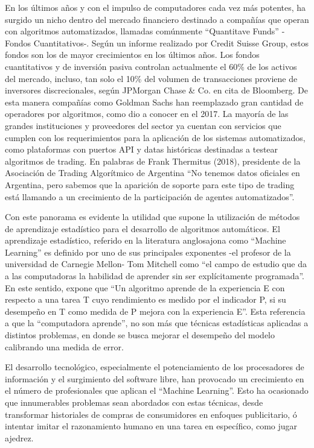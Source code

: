 \documentclass[a4paper,12pt]{Latex/Classes/PhDthesisPSnPDF}
\begin{document}
En los últimos años y con el impulso de computadores cada vez más potentes, ha surgido un nicho dentro del mercado financiero destinado a compañías que operan con algoritmos automatizados, llamadas comúnmente “Quantitave Funds” -Fondos Cuantitativos-. Según un informe realizado por Credit Suisse Group, estos fondos son los de mayor crecimientos en los últimos años. Los fondos cuantitativos y de inversión pasiva controlan actualmente el 60\% de los activos del mercado, incluso, tan solo el 10\% del volumen de transacciones proviene de inversores discrecionales, según JPMorgan Chase \& Co. en cita de Bloomberg. De esta manera compañías como Goldman Sachs han reemplazado gran cantidad de operadores por algoritmos, como dio a conocer en el 2017. La mayoría de las grandes instituciones y proveedores del sector ya cuentan con servicios que cumplen con los requerimientos para la aplicación de los sistemas automatizados, como plataformas con puertos API y datas históricas destinadas a testear algoritmos de trading. En palabras de Frank Thermitus (2018), presidente de la Asociación de Trading Algorítmico de Argentina “No tenemos datos oficiales en Argentina, pero sabemos que la aparición de soporte para este tipo de trading está llamando a un crecimiento de la participación de agentes automatizados”.

Con este panorama es evidente la utilidad que supone la utilización de métodos de aprendizaje estadístico para el desarrollo de algoritmos automáticos. El aprendizaje estadístico, referido en la literatura anglosajona como “Machine Learning” es definido por uno de sus principales exponentes -el profesor de la universidad de Carnegie Mellon- Tom Mitchell como “el campo de estudio que da a las computadoras la habilidad de aprender sin ser explícitamente programada”. En este sentido, expone que “Un algoritmo aprende de la experiencia E con respecto a una tarea T cuyo rendimiento es medido por el indicador P, si su desempeño en T como medida de P mejora con la experiencia E”. Esta referencia a que la “computadora aprende”, no son más que técnicas estadísticas aplicadas a distintos problemas, en donde se busca mejorar el desempeño del modelo calibrando una medida de error.

El desarrollo tecnológico, especialmente el potenciamiento de los procesadores de información y el surgimiento del software libre, han provocado un crecimiento en el número de profesionales que aplican el “Machine Learning”. Esto ha ocasionado que innumerables problemas sean abordados con estas técnicas, desde transformar historiales de compras de consumidores en enfoques publicitario, ó intentar imitar el razonamiento humano en una tarea en específico, como jugar ajedrez.
\end{document}
